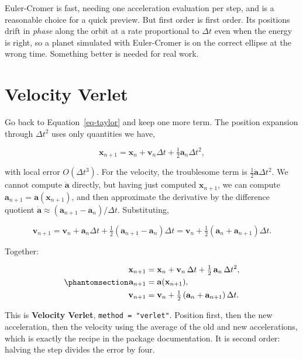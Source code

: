 \documentclass[
  10.5pt,
  letterpaper,
]{scrbook}
\theoremstyle{definition}
\theoremstyle{plain}
\theoremstyle{remark}
\begin{document}
Euler-Cromer is fast, needing one acceleration evaluation per step, and
is a reasonable choice for a quick preview. But first order is first
order. Its positions drift in \emph{phase} along the orbit at a rate
proportional to \(\Delta t\) even when the energy is right, so a planet
simulated with Euler-Cromer is on the correct ellipse at the wrong time.
Something better is needed for real work.

\section{Velocity Verlet}\label{velocity-verlet}

Go back to Equation~\ref{eq-taylor} and keep one more term. The position
expansion through \(\Delta t^2\) uses only quantities we have,

\[
\mathbf{x}_{n+1} = \mathbf{x}_n + \mathbf{v}_n\Delta t + \tfrac12\mathbf{a}_n\Delta t^2,
\]

with local error \(O(\Delta t^3)\). For the velocity, the troublesome
term is \(\tfrac12\dot{\mathbf{a}}\Delta t^2\). We cannot compute
\(\dot{\mathbf{a}}\) directly, but having just computed
\(\mathbf{x}_{n+1}\), we can compute
\(\mathbf{a}_{n+1} = \mathbf{a}(\mathbf{x}_{n+1})\), and then
approximate the derivative by the difference quotient
\(\dot{\mathbf{a}} \approx (\mathbf{a}_{n+1} - \mathbf{a}_n)/\Delta t\).
Substituting,

\[
\mathbf{v}_{n+1} = \mathbf{v}_n + \mathbf{a}_n\Delta t + \tfrac12(\mathbf{a}_{n+1} - \mathbf{a}_n)\Delta t
= \mathbf{v}_n + \tfrac12(\mathbf{a}_n + \mathbf{a}_{n+1})\Delta t.
\]

Together:

\begin{equation}\protect\phantomsection\label{eq-verlet}{
\begin{aligned}
\mathbf{x}_{n+1} &= \mathbf{x}_n + \mathbf{v}_n\,\Delta t + \tfrac12\,\mathbf{a}_n\,\Delta t^2, \\
\mathbf{a}_{n+1} &= \mathbf{a}(\mathbf{x}_{n+1}), \\
\mathbf{v}_{n+1} &= \mathbf{v}_n + \tfrac12\left(\mathbf{a}_n + \mathbf{a}_{n+1}\right)\Delta t.
\end{aligned}
}\end{equation}

This is \textbf{Velocity Verlet}, \texttt{method\ =\ "verlet"}. Position
first, then the new acceleration, then the velocity using the average of
the old and new accelerations, which is exactly the recipe in the
package documentation. It is second order: halving the step divides the
error by four.
\end{document}
